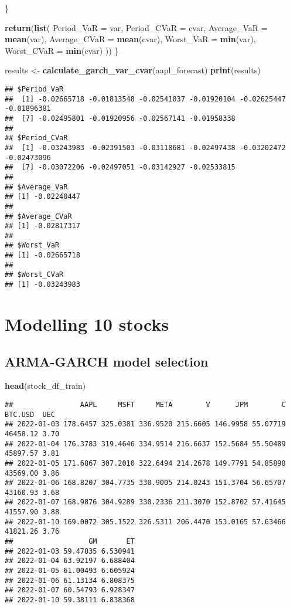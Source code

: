 \documentclass[
]{article}
\newenvironment{Shaded}{\begin{snugshade}}{\end{snugshade}}
\newcommand{\AttributeTok}[1]{\textcolor[rgb]{0.13,0.29,0.53}{#1}}
\newcommand{\FunctionTok}[1]{\textcolor[rgb]{0.13,0.29,0.53}{\textbf{#1}}}
\newcommand{\NormalTok}[1]{#1}
\newcommand{\OtherTok}[1]{\textcolor[rgb]{0.56,0.35,0.01}{#1}}
\begin{document}
\begin{Shaded}
\begin{Highlighting}[]
\NormalTok{  \}}
  
  \FunctionTok{return}\NormalTok{(}\FunctionTok{list}\NormalTok{(}
    \AttributeTok{Period\_VaR =}\NormalTok{ var,}
    \AttributeTok{Period\_CVaR =}\NormalTok{ cvar,}
    \AttributeTok{Average\_VaR =} \FunctionTok{mean}\NormalTok{(var),}
    \AttributeTok{Average\_CVaR =} \FunctionTok{mean}\NormalTok{(cvar),}
    \AttributeTok{Worst\_VaR =} \FunctionTok{min}\NormalTok{(var),}
    \AttributeTok{Worst\_CVaR =} \FunctionTok{min}\NormalTok{(cvar)}
\NormalTok{  ))}
\NormalTok{\}}


\NormalTok{results }\OtherTok{\textless{}{-}} \FunctionTok{calculate\_garch\_var\_cvar}\NormalTok{(aapl\_forecast)}
\FunctionTok{print}\NormalTok{(results)}
\end{Highlighting}
\end{Shaded}

\begin{verbatim}
## $Period_VaR
##  [1] -0.02665718 -0.01813548 -0.02541037 -0.01920104 -0.02625447 -0.01896381
##  [7] -0.02495801 -0.01920956 -0.02567141 -0.01958338
## 
## $Period_CVaR
##  [1] -0.03243983 -0.02391503 -0.03118681 -0.02497438 -0.03202472 -0.02473096
##  [7] -0.03072206 -0.02497051 -0.03142927 -0.02533815
## 
## $Average_VaR
## [1] -0.02240447
## 
## $Average_CVaR
## [1] -0.02817317
## 
## $Worst_VaR
## [1] -0.02665718
## 
## $Worst_CVaR
## [1] -0.03243983
\end{verbatim}

\section{Modelling 10 stocks}\label{modelling-10-stocks}

\subsection{ARMA-GARCH model
selection}\label{arma-garch-model-selection}

\begin{Shaded}
\begin{Highlighting}[]
\FunctionTok{head}\NormalTok{(stock\_df\_train)}
\end{Highlighting}
\end{Shaded}

\begin{verbatim}
##                AAPL     MSFT     META        V      JPM        C  BTC.USD  UEC
## 2022-01-03 178.6457 325.0381 336.9520 215.6605 146.9958 55.07719 46458.12 3.70
## 2022-01-04 176.3783 319.4646 334.9514 216.6637 152.5684 55.50489 45897.57 3.81
## 2022-01-05 171.6867 307.2010 322.6494 214.2678 149.7791 54.85898 43569.00 3.86
## 2022-01-06 168.8207 304.7735 330.9005 214.0243 151.3704 56.65707 43160.93 3.68
## 2022-01-07 168.9876 304.9289 330.2336 211.3070 152.8702 57.41645 41557.90 3.88
## 2022-01-10 169.0072 305.1522 326.5311 206.4470 153.0165 57.63466 41821.26 3.76
##                  GM       ET
## 2022-01-03 59.47835 6.530941
## 2022-01-04 63.92197 6.688404
## 2022-01-05 61.00493 6.605924
## 2022-01-06 61.13134 6.808375
## 2022-01-07 60.54793 6.928347
## 2022-01-10 59.38111 6.838368
\end{verbatim}
\end{document}
